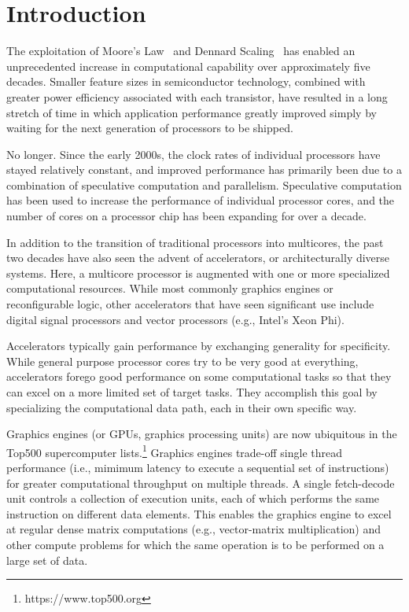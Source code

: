 \section{Introduction}
\label{sec:intro}

The exploitation of Moore's Law~\cite{Moore65,Mack11}
and Dennard Scaling~\cite{Dennard74,Bohr07}
has enabled an unprecedented increase in computational capability over 
approximately five decades. Smaller feature sizes in semiconductor
technology, combined with greater power efficiency associated with each
transistor, have resulted in a long stretch of time in which application
performance greatly improved simply by waiting for the next generation
of processors to be shipped.

No longer. Since the early 2000s, the clock rates of individual processors
have stayed relatively constant, and improved performance has primarily
been due to a combination of speculative computation and parallelism.
Speculative computation has been used to increase the performance of
individual processor cores, and the number of cores on a processor chip
has been expanding for over a decade.

In addition to the transition of traditional processors into multicores,
the past two decades have also seen the advent of accelerators, or
architecturally diverse systems.  Here, a multicore processor is augmented
with one or more specialized computational resources.  While most
commonly graphics engines or reconfigurable logic, other accelerators
that have seen significant use include digital signal processors
and vector processors (e.g., Intel's Xeon Phi).

Accelerators typically gain performance by exchanging generality for
specificity. While general purpose processor cores try to be very good
at everything, accelerators forego good performance on some computational
tasks so that they can excel on a more limited set of target tasks.
They accomplish this goal by specializing the computational data path,
each in their own specific way.

Graphics engines (or GPUs, graphics processing units) are now ubiquitous
in the Top500 supercomputer lists.\footnote{https://www.top500.org}
Graphics engines trade-off single thread performance (i.e., mimimum latency
to execute a sequential set of instructions) for greater computational
throughput on multiple threads.  A single fetch-decode unit controls a
collection of execution units, each of which performs the same instruction
on different data elements.  This enables the graphics engine to excel
at regular dense matrix computations (e.g., vector-matrix multiplication)
and other compute problems for which the same operation is to be performed
on a large set of data.

